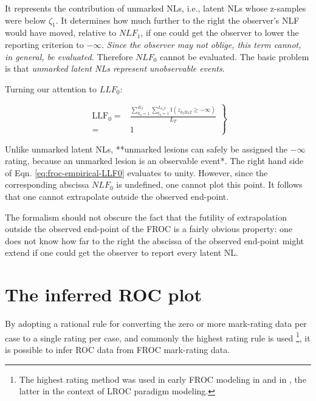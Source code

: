 \documentclass[
]{book}
\begin{document}
It represents the contribution of unmarked NLs, i.e., latent NLs whose z-samples were below \(\zeta_1\). It determines how much further to the right the observer's NLF would have moved, relative to \(NLF_1\), if one could get the observer to lower the reporting criterion to \(-\infty\). \emph{Since the observer may not oblige, this term cannot, in general, be evaluated.} Therefore \(NLF_0\) cannot be evaluated. The basic problem is that \emph{unmarked latent NLs represent unobservable events}.

Turning our attention to \(LLF_0\):

\begin{equation}
\left.
\begin{aligned}
\text{LLF}_0 =& \frac{ \sum_{k_2=1}^{K_2} \sum_{l_2=1}^{L_{k_2 2}} \mathbb{I} \left ( z_{k_2 2 l_2 2} \geq  -\infty  \right ) }{L_T}\\
=& 1
\end{aligned}
\right \}
\label{eq:froc-empirical-LLF0}
\end{equation}

Unlike unmarked latent NLs, **unmarked lesions can safely be assigned the \(-\infty\) rating, because an unmarked lesion is an observable event*. The right hand side of Eqn. \eqref{eq:froc-empirical-LLF0} evaluates to unity. However, since the corresponding abscissa \(NLF_0\) is undefined, one cannot plot this point. It follows that one cannot extrapolate outside the observed end-point.

The formalism should not obscure the fact that the futility of extrapolation outside the observed end-point of the FROC is a fairly obvious property: one does not know how far to the right the abscissa of the observed end-point might extend if one could get the observer to report every latent NL.

\hypertarget{froc-empirical-ROC}{%
\section{The inferred ROC plot}\label{froc-empirical-ROC}}

By adopting a rational rule for converting the zero or more mark-rating data per case to a single rating per case, and commonly the highest rating rule is used \footnote{The highest rating method was used in early FROC modeling in \citep{bunch1977free} and in \citep{swensson1996unified}, the latter in the context of LROC paradigm modeling.}, it is possible to infer ROC data from FROC mark-rating data.
\end{document}
